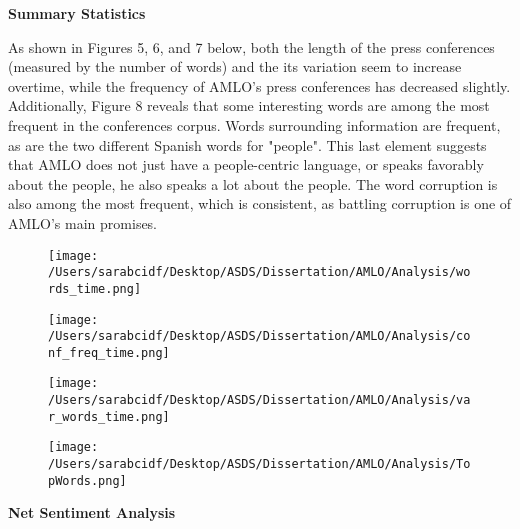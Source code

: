 \documentclass[]{article}
\begin{document}
\vspace{.5cm}
\noindent\textbf{Summary Statistics}
\vspace{.5cm}

As shown in Figures 5, 6, and 7 below, both the length of the press conferences (measured by the number of words) and the its variation seem to increase overtime, while the frequency of AMLO's press conferences has decreased slightly. Additionally, Figure 8 reveals that some interesting words are among the most frequent in the conferences corpus. Words surrounding information are frequent, as are the two different Spanish words for "people". This last element suggests that AMLO does not just have a people-centric language, or speaks favorably about the people, he also speaks a lot about the people. The word corruption is also among the most frequent, which is consistent, as battling corruption is one of AMLO's main promises.  

\newpage
\vspace*{\fill}

\begin{figure}[H]
	\centering
	\caption{\label{}}
	\texttt{[image: /Users/sarabcidf/Desktop/ASDS/Dissertation/AMLO/Analysis/words\_time.png]}
\end{figure}

\begin{figure}[H]
	\centering
	\caption{\label{}}
	\texttt{[image: /Users/sarabcidf/Desktop/ASDS/Dissertation/AMLO/Analysis/conf\_freq\_time.png]}
\end{figure}

\vspace*{\fill}

\newpage
\vspace*{\fill}

\begin{figure}[H]
	\centering
	\caption{\label{}}
	\texttt{[image: /Users/sarabcidf/Desktop/ASDS/Dissertation/AMLO/Analysis/var\_words\_time.png]}
\end{figure}

\begin{figure}[H]
	\centering
	\caption{\label{}}
	\texttt{[image: /Users/sarabcidf/Desktop/ASDS/Dissertation/AMLO/Analysis/TopWords.png]}
\end{figure}

\vspace*{\fill}

\newpage
\vspace{.5cm}
\noindent\textbf{Net Sentiment Analysis}
\vspace{.5cm}
\end{document}

